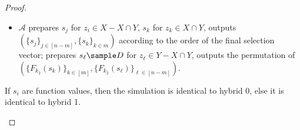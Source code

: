 \begin{proof}
\begin{trivlist}
\begin{itemize}
    \item $\mathcal{A}$ prepares $s_j$ for $z_i \in X - X \cap Y$, 
        $s_k$ for $z_k \in X \cap Y$, 
        outputs $(\{s_j\}_{j \in [n-m]}, \{s_k\}_{k \in m})$ according to the order of the final selection vector; 
        prepares $s_\ell \sample D$ for $z_\ell \in Y - X \cap Y$,  
        outputs the permutation of $(\{F_{k_2}(s_k)\}_{k \in [m]}, \{F_{k_2}(s_\ell)\}_{\ell \in [n-m]})$.               
\end{itemize}

If $s_i$ are function values, then the simulation is identical to hybrid 0, 
else it is identical to hybrid 1. 
\end{trivlist}
\end{proof}






